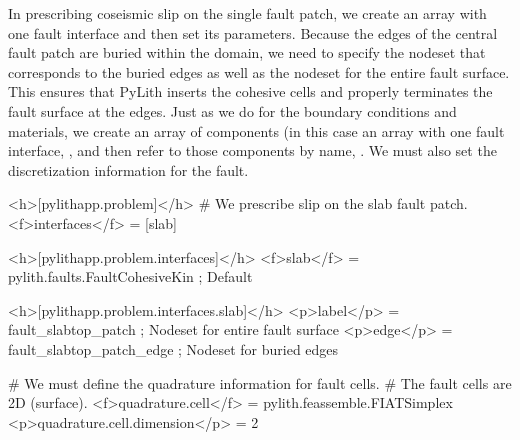 In prescribing coseismic slip on the single fault patch, we create an
array with one fault interface and then set its parameters. Because
the edges of the central fault patch are buried within the domain, we
need to specify the nodeset that corresponds to the buried edges as
well as the nodeset for the entire fault surface. This ensures that
PyLith inserts the cohesive cells and properly terminates the fault
surface at the edges. Just as we do for the boundary conditions and
materials, we create an array of components (in this case an array
with one fault interface, , and then refer to those
components by name, . We
must also set the discretization information for the fault.
\begin{cfg}
<h>[pylithapp.problem]</h>
# We prescribe slip on the slab fault patch.
<f>interfaces</f> = [slab]

<h>[pylithapp.problem.interfaces]</h>
<f>slab</f> = pylith.faults.FaultCohesiveKin ; Default

<h>[pylithapp.problem.interfaces.slab]</h>
<p>label</p> = fault_slabtop_patch ; Nodeset for entire fault surface
<p>edge</p> = fault_slabtop_patch_edge ; Nodeset for buried edges

# We must define the quadrature information for fault cells.
# The fault cells are 2D (surface).
<f>quadrature.cell</f> = pylith.feassemble.FIATSimplex
<p>quadrature.cell.dimension</p> = 2
\end{cfg}

